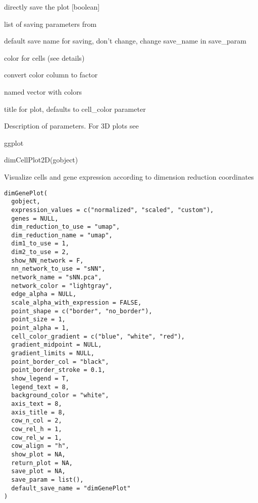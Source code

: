 \documentclass[a4paper]{book}
\begin{document}
\begin{Arguments}
\begin{ldescription}
\item[\code{save\_plot}] directly save the plot [boolean]

\item[\code{save\_param}] list of saving parameters from 

\item[\code{default\_save\_name}] default save name for saving, don't change, change save\_name in save\_param

\item[\code{cell\_color}] color for cells (see details)

\item[\code{color\_as\_factor}] convert color column to factor

\item[\code{cell\_color\_code}] named vector with colors

\item[\code{title}] title for plot, defaults to cell\_color parameter
\end{ldescription}
\end{Arguments}
%
\begin{Details}\relax
Description of parameters. For 3D plots see 
\end{Details}
%
\begin{Value}
ggplot
\end{Value}
%
\begin{Examples}
\begin{ExampleCode}
    dimCellPlot2D(gobject)
\end{ExampleCode}
\end{Examples}
%
\begin{Description}\relax
Visualize cells and gene expression according to dimension reduction coordinates
\end{Description}
%
\begin{Usage}
\begin{verbatim}
dimGenePlot(
  gobject,
  expression_values = c("normalized", "scaled", "custom"),
  genes = NULL,
  dim_reduction_to_use = "umap",
  dim_reduction_name = "umap",
  dim1_to_use = 1,
  dim2_to_use = 2,
  show_NN_network = F,
  nn_network_to_use = "sNN",
  network_name = "sNN.pca",
  network_color = "lightgray",
  edge_alpha = NULL,
  scale_alpha_with_expression = FALSE,
  point_shape = c("border", "no_border"),
  point_size = 1,
  point_alpha = 1,
  cell_color_gradient = c("blue", "white", "red"),
  gradient_midpoint = NULL,
  gradient_limits = NULL,
  point_border_col = "black",
  point_border_stroke = 0.1,
  show_legend = T,
  legend_text = 8,
  background_color = "white",
  axis_text = 8,
  axis_title = 8,
  cow_n_col = 2,
  cow_rel_h = 1,
  cow_rel_w = 1,
  cow_align = "h",
  show_plot = NA,
  return_plot = NA,
  save_plot = NA,
  save_param = list(),
  default_save_name = "dimGenePlot"
)
\end{verbatim}
\end{Usage}
\end{document}
